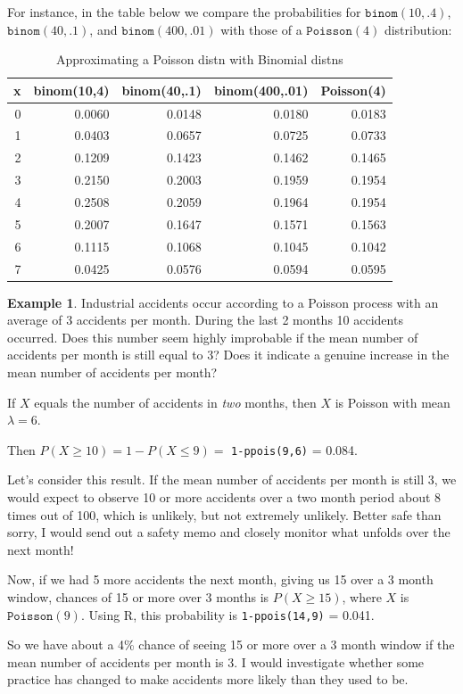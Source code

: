 \documentclass[
]{book}
\theoremstyle{definition}
\theoremstyle{definition}
\newtheorem{example}{Example}[chapter]
\theoremstyle{definition}
\theoremstyle{definition}
\theoremstyle{remark}
\begin{document}
For instance, in the table below we compare the probabilities for \(\texttt{binom}(10,.4)\), \(\texttt{binom}(40,.1)\), and \(\texttt{binom}(400,.01)\) with those of a \(\texttt{Poisson}(4)\) distribution:

\begin{table}
\centering
\caption{\label{tab:plot-pois-binom}Approximating a Poisson distn with Binomial distns}
\centering
\begin{tabular}[t]{r|r|r|r|r}
\hline
x & binom(10,4) & binom(40,.1) & binom(400,.01) & Poisson(4)\\
\hline
0 & 0.0060 & 0.0148 & 0.0180 & 0.0183\\
\hline
1 & 0.0403 & 0.0657 & 0.0725 & 0.0733\\
\hline
2 & 0.1209 & 0.1423 & 0.1462 & 0.1465\\
\hline
3 & 0.2150 & 0.2003 & 0.1959 & 0.1954\\
\hline
4 & 0.2508 & 0.2059 & 0.1964 & 0.1954\\
\hline
5 & 0.2007 & 0.1647 & 0.1571 & 0.1563\\
\hline
6 & 0.1115 & 0.1068 & 0.1045 & 0.1042\\
\hline
7 & 0.0425 & 0.0576 & 0.0594 & 0.0595\\
\hline
\end{tabular}
\end{table}

\begin{example}
\protect\hypertarget{exm:pois-process}{}\label{exm:pois-process}Industrial accidents occur according to a Poisson process with an average of 3 accidents per month. During the last 2 months 10 accidents occurred. Does this number seem highly improbable if the mean number of accidents per month is still equal to 3? Does it indicate a genuine increase in the mean number of accidents per month?

If \(X\) equals the number of accidents in \emph{two} months, then \(X\) is Poisson with mean \(\lambda = 6\).

Then \(P(X \geq 10) = 1 - P(X \leq 9) =\) \texttt{1-ppois(9,6)} = 0.084.

Let's consider this result. If the mean number of accidents per month is still 3, we would expect to observe 10 or more accidents over a two month period about 8 times out of 100, which is unlikely, but not extremely unlikely. Better safe than sorry, I would send out a safety memo and closely monitor what unfolds over the next month!

Now, if we had 5 more accidents the next month, giving us 15 over a 3 month window, chances of 15 or more over 3 months is \(P(X \geq 15)\), where \(X\) is \(\texttt{Poisson}(9)\). Using R, this probability is \texttt{1-ppois(14,9)} = 0.041.

So we have about a 4\% chance of seeing 15 or more over a 3 month window if the mean number of accidents per month is 3. I would investigate whether some practice has changed to make accidents more likely than they used to be.
\end{example}
\end{document}
